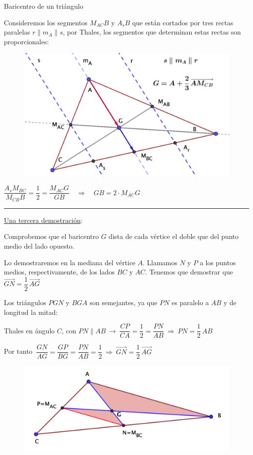 \begin{myexampleblock}{Baricentro de un triángulo}
\begin{small}
\begin{multicols}{2}
\vspace{1mm} Consideremos los segmentos $M_{AC}B$ y $A_sB$ que están cortados por tres rectas paralelas $r\parallel m_A \parallel s$, por Thales, los segmentos que determinan estas rectas son proporcionales:
\begin{figure}[H]
	\centering
	\includegraphics[width=.5\textwidth]{img-ga/ga28.png}
\end{figure}	
\end{multicols}


\vspace{2mm} $\dfrac{A_sM_{BC}}{M_{CB}B}=\dfrac{1}{2}=\dfrac{M_{AC}G}{GB}  \quad \Rightarrow \quad GB=2\cdot M_{AC}G$ \QED 
\end{small} %


\begin{center}\rule{250pt}{0.1pt}\end{center}

\vspace{2mm} 
\underline{Una tercera demostración}: 

\begin{multicols}{2}
Comprobemos que el baricentro $G$ dista de cada vértice el doble que del punto medio del lado opuesto.

\vspace{2mm} Lo demostraremos en la mediana del vértice $A$. Llamamos $N$ y $P$ a los puntos medios, respectivamente, de los lados $BC$ y $AC$. Tenemos que demostrar que $\overrightarrow{GN}=\dfrac 1 2 \, \overrightarrow{AG}$

\vspace{2mm}  Los triángulos $PGN$ y $BGA$ son semejantes, ya que $PN$ es paralelo a $AB$ y de longitud la mitad:

\vspace{2mm} \textcolor{gris}{ Thales en ángulo $C$, con $PN\parallel AB \ \to \  \dfrac{CP}{CA}=\dfrac{1}{2}=\dfrac{PN}{AB} \ \Rightarrow \ PN=\dfrac 1 2 \, AB$}

\vspace{2mm}  Por tanto $\ \dfrac{GN}{AG}=\dfrac{GP}{BG}=\dfrac{PN}{AB}=\dfrac{1}{2} \ \Rightarrow \  \overrightarrow{GN}=\dfrac 1 2 \, \overrightarrow{AG}$
\begin{figure}[H]
	\centering
	\includegraphics[width=.5\textwidth]{img-ga/ga33.png}
\end{figure}	
\end{multicols}


\end{myexampleblock}

